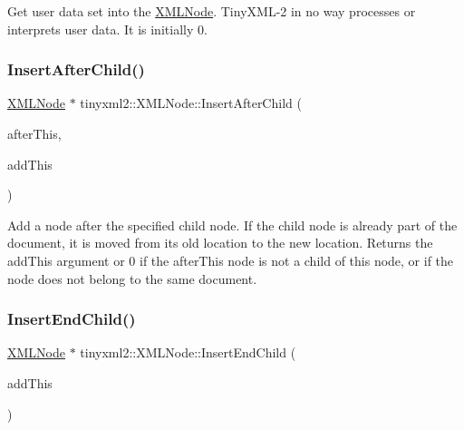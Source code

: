 Get user data set into the \mbox{\hyperlink{classtinyxml2_1_1_x_m_l_node}{X\+M\+L\+Node}}. Tiny\+X\+M\+L-\/2 in no way processes or interprets user data. It is initially 0. \mbox{\label{classtinyxml2_1_1_x_m_l_node_a9275138a1b8dd5d8e2c26789bdc23ac8}} 
\subsubsection{\texorpdfstring{Insert\+After\+Child()}{InsertAfterChild()}}
{\footnotesize\ttfamily \mbox{\hyperlink{classtinyxml2_1_1_x_m_l_node}{X\+M\+L\+Node}} $\ast$ tinyxml2\+::\+X\+M\+L\+Node\+::\+Insert\+After\+Child (\begin{DoxyParamCaption}\item[{\mbox{\hyperlink{classtinyxml2_1_1_x_m_l_node}{X\+M\+L\+Node}} $\ast$}]{after\+This,  }\item[{\mbox{\hyperlink{classtinyxml2_1_1_x_m_l_node}{X\+M\+L\+Node}} $\ast$}]{add\+This }\end{DoxyParamCaption})}

Add a node after the specified child node. If the child node is already part of the document, it is moved from its old location to the new location. Returns the add\+This argument or 0 if the after\+This node is not a child of this node, or if the node does not belong to the same document. \mbox{\label{classtinyxml2_1_1_x_m_l_node_ae3b422e98914d6002ca99bb1d2837103}} 
\subsubsection{\texorpdfstring{Insert\+End\+Child()}{InsertEndChild()}}
{\footnotesize\ttfamily \mbox{\hyperlink{classtinyxml2_1_1_x_m_l_node}{X\+M\+L\+Node}} $\ast$ tinyxml2\+::\+X\+M\+L\+Node\+::\+Insert\+End\+Child (\begin{DoxyParamCaption}\item[{\mbox{\hyperlink{classtinyxml2_1_1_x_m_l_node}{X\+M\+L\+Node}} $\ast$}]{add\+This }\end{DoxyParamCaption})}

